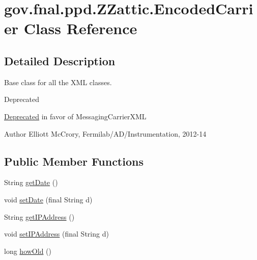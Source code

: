 \hypertarget{classgov_1_1fnal_1_1ppd_1_1ZZattic_1_1EncodedCarrier}{\section{gov.\-fnal.\-ppd.\-Z\-Zattic.\-Encoded\-Carrier Class Reference}
\label{classgov_1_1fnal_1_1ppd_1_1ZZattic_1_1EncodedCarrier}
}


\subsection{Detailed Description}
Base class for all the X\-M\-L classes. \begin{DoxyRefDesc}{Deprecated}
\item[\hyperlink{deprecated__deprecated000013}{Deprecated}]in favor of Messaging\-Carrier\-X\-M\-L\end{DoxyRefDesc}


\begin{DoxyAuthor}{Author}
Elliott Mc\-Crory, Fermilab/\-A\-D/\-Instrumentation, 2012-\/14 
\end{DoxyAuthor}
\subsection*{Public Member Functions}
\begin{DoxyCompactItemize}
\item 
String \hyperlink{classgov_1_1fnal_1_1ppd_1_1ZZattic_1_1EncodedCarrier_a78d0cd10e1a13e78e697e6559b265aa5}{get\-Date} ()
\item 
void \hyperlink{classgov_1_1fnal_1_1ppd_1_1ZZattic_1_1EncodedCarrier_aec293d5ce2d9ca7c8c13091085c4cad8}{set\-Date} (final String d)
\item 
String \hyperlink{classgov_1_1fnal_1_1ppd_1_1ZZattic_1_1EncodedCarrier_a099c08a698c6dad95fe960430c7d24e2}{get\-I\-P\-Address} ()
\item 
void \hyperlink{classgov_1_1fnal_1_1ppd_1_1ZZattic_1_1EncodedCarrier_aeddf788b5506883bd7398d45f2115497}{set\-I\-P\-Address} (final String d)
\item 
long \hyperlink{classgov_1_1fnal_1_1ppd_1_1ZZattic_1_1EncodedCarrier_ab4252d10a9b8b817738c26305dc0fa23}{how\-Old} ()
\end{DoxyCompactItemize}
